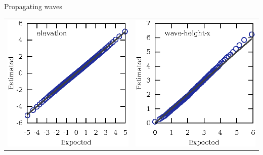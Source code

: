 \documentclass[14pt,aspectratio=169]{beamer}
\begin{document}
\begin{frame}
\begin{columns}
			\begin{column}{0.5\textwidth}
				\centering%
				Propagating waves
				\begin{tabular}{ll}
					\includegraphics[scale=0.5]{propagating-elevation} &
					\includegraphics[scale=0.5]{propagating-wave-height-x} \\

\end{tabular}
\end{column}
\end{columns}
\end{frame}
\end{document}
